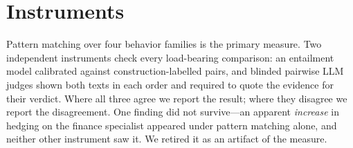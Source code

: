 \documentclass[11pt]{article}
\begin{document}
\section{Instruments}
\label{app:instr}
Pattern matching over four behavior families is the primary measure. Two
independent instruments check every load-bearing comparison: an entailment
model calibrated against construction-labelled pairs, and blinded pairwise LLM
judges shown both texts in each order and required to quote the evidence for
their verdict. Where all three agree we report the result; where they disagree
we report the disagreement. One finding did not survive---an apparent
\emph{increase} in hedging on the finance specialist appeared under pattern
matching alone, and neither other instrument saw it. We retired it as an
artifact of the measure.
\end{document}
